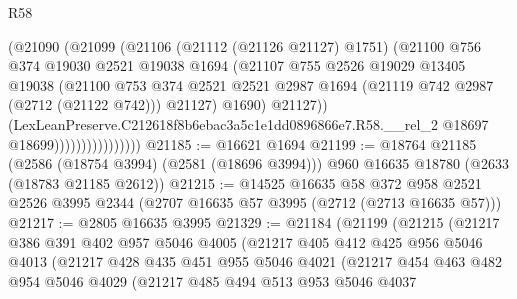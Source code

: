\begin{lexlean}{R58}
\begin{coremodule}
                              (@21090
                                (@21099
                                  (@21106
                                    (@21112 (@21126 @21127) @1751)
                                    (@21100
                                      @756
                                      @374
                                      @19030
                                      @2521
                                      @19038
                                      @1694
                                      (@21107
                                        @755
                                        @2526
                                        @19029
                                        @13405
                                        @19038
                                        (@21100
                                          @753
                                          @374
                                          @2521
                                          @2521
                                          @2987
                                          @1694
                                          (@21119 @742 @2987 (@2712 (@21122 @742)))
                                          @21127)
                                        @1690)
                                      @21127))
                                  (LexLeanPreserve.C212618f8b6ebac3a5c1e1dd0896866e7.R58.__rel_2
                                    @18697
                                    @18699))))))))))))))))
@21185 := @16621 @1694
@21199 := @18764
    @21185
    (@2586 (@18754 @3994) (@2581 (@18696 @3994)))
    @960
    @16635
    @18780
    (@2633 (@18783 @21185 @2612))
@21215 := @14525
    @16635
    @58
    @372
    @958
    @2521
    @2526
    @3995
    @2344
    (@2707 @16635 @57 @3995 (@2712 (@2713 @16635 @57)))
@21217 := @2805 @16635 @3995
@21329 := @21184
    (@21199
      (@21215
        (@21217
          @386
          @391
          @402
          @957
          @5046
          @4005
          (@21217
            @405
            @412
            @425
            @956
            @5046
            @4013
            (@21217
              @428
              @435
              @451
              @955
              @5046
              @4021
              (@21217
                @454
                @463
                @482
                @954
                @5046
                @4029
                (@21217
                  @485
                  @494
                  @513
                  @953
                  @5046
                  @4037

\end{coremodule}
\end{lexlean}
